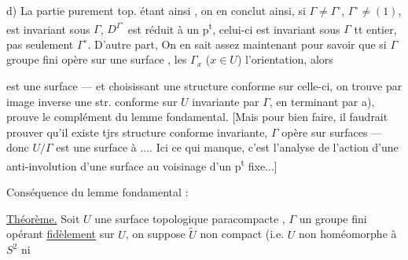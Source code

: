  d) La partie purement top. étant ainsi  , on en conclut ainsi, si $\Gamma\ne\Gamma^\circ$, $\Gamma^\circ\ne(1)$,     est invariant sous $\Gamma$,   $D^{\Gamma^\circ}$ est réduit à un p\textsuperscript{t}, celui-ci est invariant sous $\Gamma$ tt entier, pas seulement $\Gamma^\circ$. D'autre part, On en sait assez maintenant pour savoir que si $\Gamma$ groupe fini opère sur une surface  , les $\Gamma_x$ ($x\in U$)  l'orientation, alors 



est une surface ---  et choisissant une structure conforme sur celle-ci, on trouve par image inverse une str. conforme sur $U$ invariante par $\Gamma$,   en terminant par a),   prouve le complément du lemme fondamental. [Mais pour bien faire, il faudrait prouver qu'il existe tjrs structure conforme invariante,   $\Gamma$ opère sur surfaces   --- donc $U/\Gamma$ est une surface à .... Ici ce qui manque, c'est l'analyse de l'action d'une anti-involution d'une surface au voisinage d'un p\textsuperscript{t} fixe...]


Conséquence du lemme fondamental :

\uline{Théorème.} Soit $U$ une surface topologique paracompacte , $\Gamma$ un groupe fini opérant \uline{fidèlement} sur $U$, on suppose $\widetilde U$  non compact (i.e. $U$ non homéomorphe à $S^2$ ni



